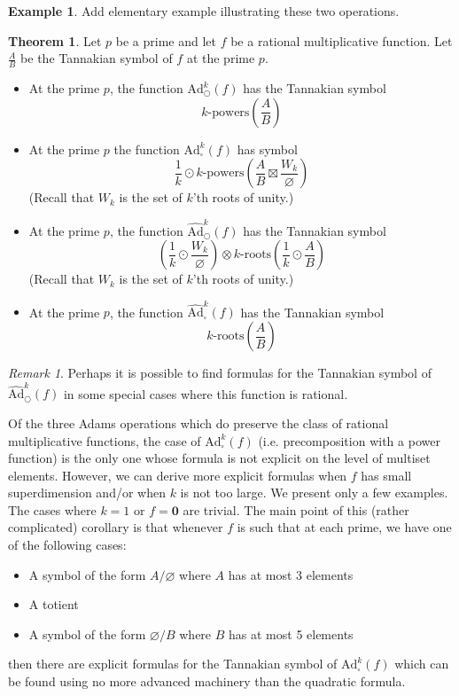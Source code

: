 \documentclass[a4paper]{article}
\theoremstyle{definition}
\newtheorem{theorem}{Theorem}[section]
\newtheorem{example}{Example}[section]
\theoremstyle{remark}
\newtheorem*{remark}{Remark}
\newcommand{\adam}[1]{\text{Ad}^{#1}_{\bigcirc}}
\newcommand{\hatadam}[1]{\widehat{\text{Ad}}^{#1}_{\bigcirc}}
\newcommand{\boxadam}[1]{\text{Ad}^{#1}_{\square}}
\newcommand{\hatboxadam}[1]{\widehat{\text{Ad}}^{#1}_{\square}}
\newcommand{\roots}[1]{{#1}\text{-roots}}
\newcommand{\powers}[1]{{#1}\text{-powers}}
\begin{document}
\begin{example}
Add elementary example illustrating these two operations.
\end{example}

\begin{theorem}
Let $p$ be a prime and let $f$ be a rational multiplicative function. Let $\frac{A}{B}$ be the Tannakian symbol of $f$ at the prime $p$. 
\begin{itemize}
\item At the prime $p$, the function $\adam{k}(f)$ has the Tannakian symbol 
$$\powers{k}(\frac{A}{B})$$

\item At the prime $p$ the function $\boxadam{k}(f)$ has symbol 
$$\frac{1}{k} \odot \powers{k}(\frac{A}{B} \boxtimes \frac{W_k}{\varnothing})$$
(Recall that $W_k$ is the set of $k$'th roots of unity.) 
\item At the prime $p$, the function $\hatadam{k}(f)$ has the Tannakian symbol
$$\left(\frac{1}{k} \odot\frac{W_k}{\varnothing}\right) \otimes \roots{k}\left(\frac{1}{k} \odot \frac{A}{B}\right)
$$
(Recall that $W_k$ is the set of $k$'th roots of unity.) 
\item At the prime $p$, the function $\hatboxadam{k}(f)$ has the Tannakian symbol 
$$\roots{k}(\frac{A}{B})$$
\end{itemize}
\end{theorem}

\begin{remark}
Perhaps it is possible to find formulas for the Tannakian symbol of $\hatadam{k}(f)$ in some special cases where this function is rational. 
\end{remark}



Of the three Adams operations which do preserve the class of rational multiplicative functions, the case of $\boxadam{k}(f)$ (i.e. precomposition with a power function) is the only one whose formula is not explicit on the level of multiset elements. However, we can derive more explicit formulas when $f$ has small superdimension and/or when $k$ is not too large. We present only a few examples. The cases where $k=1$ or $f= \mathbf{0}$ are trivial. The main point of this (rather complicated) corollary is that whenever $f$ is such that at each prime, we have one of the following cases:
\begin{itemize}
\item A symbol of the form $A/ \varnothing$ where $A$ has at most 3 elements
\item A totient
\item A symbol of the form $\varnothing / B$ where $B$ has at most 5 elements
\end{itemize}
then there are explicit formulas for the Tannakian symbol of $\boxadam{k}(f)$ which can be found using no more advanced machinery than the quadratic formula.
\end{document}
